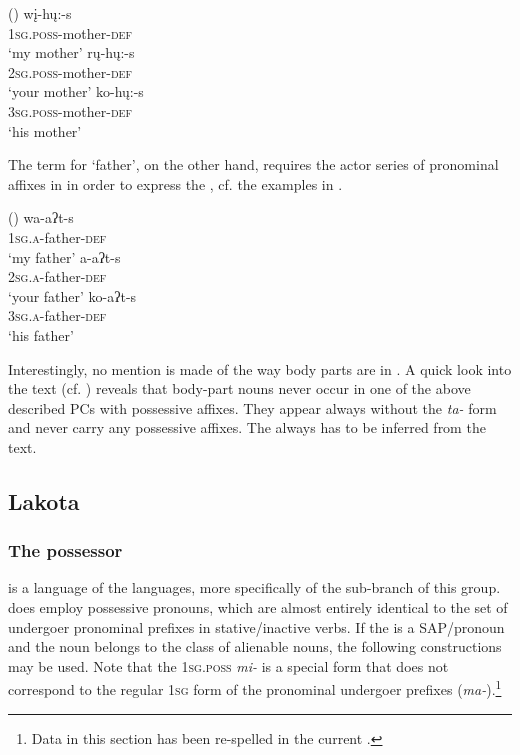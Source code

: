 \documentclass[output=paper]{LSP/langsci}
\begin{document}
\ea {} (\citealt[45]{Mixco1997a}) \label{mandanmother}
\ea
\gll wį-hų:-s \\			
\textsc{1sg.poss}-mother-\textsc{def} \\
\glt `my mother'
\ex \gll rų-hų:-s \\
\textsc{2sg.poss}-mother-\textsc{def} \\
\glt `your mother'
\ex \gll ko-hų:-s \\
\textsc{3sg.poss}-mother-\textsc{def} \\
\glt `his mother'
\z \z

The term for `father', on the other hand, requires the actor series of pronominal affixes in  in order to express the , cf. the examples in .

\ea {} (\citealt[45]{Mixco1997a}) \label{mandanfather}
\ea \gll wa-aʔt-s \\
\textsc{1sg.a}-father-\textsc{def} \\
\glt `my father'
\ex \gll a-aʔt-s \\
\textsc{2sg.a}-father-\textsc{def} \\
\glt `your father'
\ex \gll ko-aʔt-s \\
\textsc{3sg.a}-father-\textsc{def} \\
\glt `his father'
\z \z

Interestingly, no mention is made of the way body parts are  in . A quick look into the  text (cf. \citealt[66ff]{Mixco1997a}) reveals that body-part nouns never occur in one of the above described PCs with possessive affixes. They appear always without the \textit{ta-} form and never carry any possessive affixes. The  always has to be inferred from the text.
 
\subsection{Lakota}\label{sec:helmbrecht:4.4} \label{lakota} 
\subsubsection{The possessor}
 is a language of the  languages, more specifically of the  sub-branch of this group.  does employ possessive pronouns, which are almost entirely identical to the set of undergoer pronominal prefixes in stative/inactive verbs. If the  is a SAP/pronoun and the  noun belongs to the class of alienable nouns, the following constructions may be used. Note that the \textsc{1sg.poss} \textit{mi-} is a special form that does not correspond to the regular \textsc{1sg} form of the pronominal undergoer prefixes (\textit{ma-}).\footnote{Data in this section has been re-spelled in the current  .}
\end{document}
